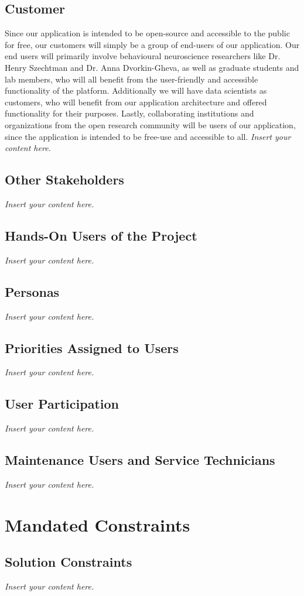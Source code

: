 \documentclass[12pt]{article}
\newcommand{\lips}{\textit{Insert your content here.}}
\begin{document}
\subsection{Customer}

\par{Since our application is intended to be \gls{open-source} and accessible to the public for free, our customers will simply be a group of end-users
of our application. Our end users will primarily involve behavioural neuroscience researchers like Dr. Henry Szechtman and Dr. Anna Dvorkin-Gheva, 
as well as graduate students and lab members, who will all benefit from the user-friendly and accessible functionality of the platform. 
Additionally we will have data scientists as customers, who will benefit from our application architecture and offered functionality for 
their purposes. Lastly, collaborating institutions and organizations from the open research community will be users of our application, 
since the application is intended to be free-use and accessible to all.}
\lips
\subsection{Other Stakeholders}
\lips
\subsection{Hands-On Users of the Project}
\lips
\subsection{Personas}
\lips
\subsection{Priorities Assigned to Users}
\lips
\subsection{User Participation}
\lips
\subsection{Maintenance Users and Service Technicians}
\lips

\section{Mandated Constraints}
\subsection{Solution Constraints}
\lips
\end{document}
